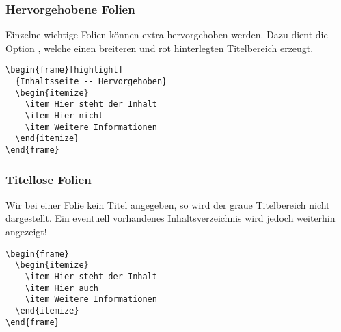 \subsubsection{Hervorgehobene Folien}

Einzelne wichtige Folien können extra hervorgehoben werden.
Dazu dient die Option ,
welche einen breiteren und rot hinterlegten Titelbereich erzeugt.

\begin{minipage}{0.5\textwidth}
\begin{verbatim}
\begin{frame}[highlight]
  {Inhaltsseite -- Hervorgehoben}
  \begin{itemize}
    \item Hier steht der Inhalt
    \item Hier nicht
    \item Weitere Informationen
  \end{itemize}
\end{frame}
\end{verbatim}
\end{minipage}
\begin{minipage}{0.5\textwidth}
\end{minipage}

\subsubsection{Titellose Folien}

Wir bei einer Folie kein Titel angegeben, so wird der graue Titelbereich
nicht dargestellt.
Ein eventuell vorhandenes Inhaltsverzeichnis wird jedoch weiterhin angezeigt!

\begin{minipage}{0.5\textwidth}
\begin{verbatim}
\begin{frame}
  \begin{itemize}
    \item Hier steht der Inhalt
    \item Hier auch
    \item Weitere Informationen
  \end{itemize}
\end{frame}
\end{verbatim}
\end{minipage}
\begin{minipage}{0.5\textwidth}
\end{minipage}

